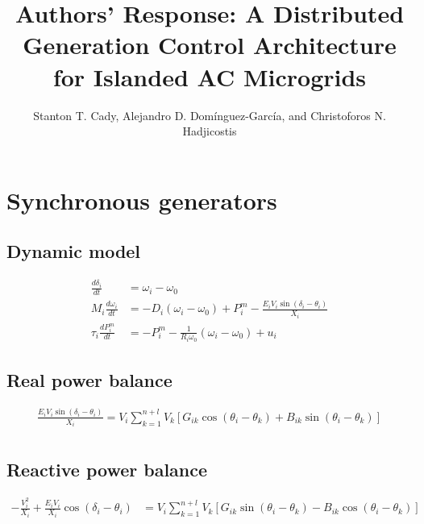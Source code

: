 \documentclass[english,11pt]{article}
\newcommand{\1}{\mathbf{1}}
\begin{document}
\title{Authors' Response: A Distributed Generation Control Architecture for Islanded AC Microgrids}


\author{Stanton T. Cady, Alejandro D. Dom\'{i}nguez-Garc\'{i}a, and Christoforos N. Hadjicostis}

\section{Synchronous generators}

\subsection{Dynamic model}
\label{subsec:synchronous_dynamic}
	\begin{align}
		\frac{d \delta_i}{dt} &= \omega_i - \omega_0\\
		M_i \frac{d \omega_i}{dt} &= -D_i (\omega_i - \omega_0) + P_i^m - \frac{E_i V_i \sin(\delta_i - \theta_i)}{X_i}\\
		\tau_i \frac{d P_i^m}{dt} &= -P_i^m - \frac{1}{R_i \omega_0}(\omega_i - \omega_0) + u_i
	\end{align}
	
\subsection{Real power balance}
	\begin{align}
		\frac{E_i V_i \sin(\delta_i - \theta_i)}{X_i} = V_i\sum_{k=1}^{n+l} V_k \left [G_{ik}\cos(\theta_i-\theta_k) + B_{ik}\sin(\theta_i-\theta_k) \right ]\\
	\end{align}
	
\subsection{Reactive power balance}
	\begin{align}
		-\frac{V_i^2}{X_i} + \frac{E_i V_i}{X_i}\cos(\delta_i - \theta_i) &= V_i \sum_{k=1}^{n+l} V_k \left [ G_{ik}\sin(\theta_i - \theta_k) - B_{ik}\cos(\theta_i - \theta_k)\right]
	\end{align}
	
\end{document}
